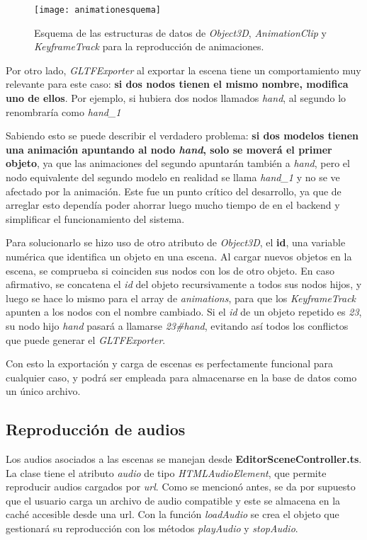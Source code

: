 \begin{figure}[h]
    \centering
    \texttt{[image: animationesquema]}
    \caption[Esquema de estructura de datos para animaciones]{Esquema de las estructuras de datos de \textit{Object3D}, \textit{AnimationClip} y \textit{KeyframeTrack} para la reproducción de animaciones.}
\end{figure}

Por otro lado, \textit{GLTFExporter} al exportar la escena tiene un comportamiento muy relevante para este caso: \textbf{si dos nodos tienen el mismo nombre, modifica uno de ellos}. Por ejemplo, si hubiera dos nodos llamados \textit{hand}, al segundo lo renombraría como \textit{hand\_1}

Sabiendo esto se puede describir el verdadero problema: \textbf{si dos modelos tienen una animación apuntando al nodo \textit{hand}, solo se moverá el primer objeto}, ya que las animaciones del segundo apuntarán también a \textit{hand}, pero el nodo equivalente del segundo modelo en realidad se llama \textit{hand\_1} y no se ve afectado por la animación. Este fue un punto crítico del desarrollo, ya que de arreglar esto dependía poder ahorrar luego mucho tiempo de en el backend y simplificar el funcionamiento del sistema. 

Para solucionarlo se hizo uso de otro atributo de \textit{Object3D}, el \textbf{id}, una variable numérica que identifica un objeto en una escena. Al cargar nuevos objetos en la escena, se comprueba si coinciden sus nodos con los de otro objeto. En caso afirmativo, se concatena el \textit{id} del objeto recursivamente a todos sus nodos hijos, y luego se hace lo mismo para el array de \textit{animations}, para que los \textit{KeyframeTrack} apunten a los nodos con el nombre cambiado. Si el \textit{id} de un objeto repetido es \textit{23}, su nodo hijo \textit{hand} pasará a llamarse \textit{23\#hand}, evitando así todos los conflictos que puede generar el \textit{GLTFExporter}.

Con esto la exportación y carga de escenas es perfectamente funcional para cualquier caso, y podrá ser empleada para almacenarse en la base de datos como un único archivo.

\subsection{Reproducción de audios}

Los audios asociados a las escenas se manejan desde \textbf{EditorSceneController.ts}. La clase tiene el atributo \textit{audio} de tipo \textit{HTMLAudioElement}, que permite reproducir audios cargados por \textit{url}. Como se mencionó antes, se da por supuesto que el usuario carga un archivo de audio compatible y este se almacena en la caché accesible desde una url. Con la función \textit{loadAudio} se crea el objeto que gestionará su reproducción con los métodos \textit{playAudio} y \textit{stopAudio}.

